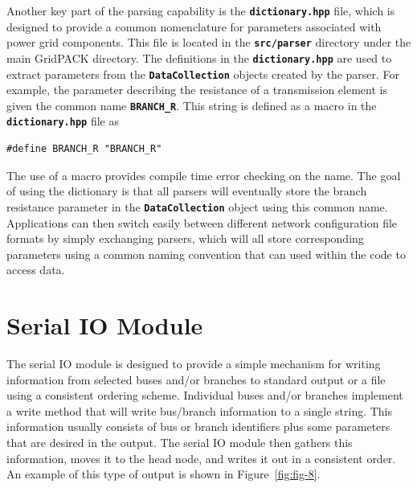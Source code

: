 \documentclass[12pt]{report} %
\begin{document}
Another key part of the parsing capability is the \texttt{\textbf{dictionary.hpp}} file, which is designed to provide a common nomenclature for parameters associated with power grid components. This file is located in the \texttt{\textbf{src/parser}} directory under the main GridPACK directory. The definitions in the \texttt{\textbf{dictionary.hpp}} are used to extract parameters from the \texttt{\textbf{DataCollection}} objects created by the parser. For example, the parameter describing the resistance of a transmission element is given the common name \texttt{\textbf{BRANCH\_R}}. This string is defined as a macro in the \texttt{\textbf{dictionary.hpp}} file as

{
\color{red}
\begin{Verbatim}[fontseries=b]
#define BRANCH_R "BRANCH_R"
\end{Verbatim}
}

The use of a macro provides compile time error checking on the name. The goal of using the dictionary is that all parsers will eventually store the branch resistance parameter in the \texttt{\textbf{DataCollection}} object using this common name. Applications can then switch easily between different network configuration file formats by simply exchanging parsers, which will all store corresponding parameters using a common naming convention that can used within the code to access data.

\section{Serial IO Module}

The serial IO module is designed to provide a simple mechanism for writing information from selected buses and/or branches to standard output or a file using a consistent ordering scheme. Individual buses and/or branches implement a write method that will write bus/branch information to a single string. This information usually consists of bus or branch identifiers plus some parameters that are desired in the output. The serial IO module then gathers this information, moves it to the head node, and writes it out in a consistent order. An example of this type of output is shown in Figure~\ref{fig:fig-8}.
\end{document}
